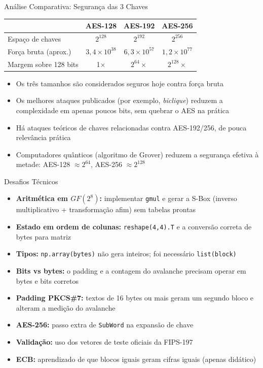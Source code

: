 \documentclass[aspectratio=169,11pt]{beamer}
\begin{document}
\begin{frame}{Análise Comparativa: Segurança das 3 Chaves}
  \small
  \begin{tabular}{lccc}
    \toprule
    & \textbf{AES-128} & \textbf{AES-192} & \textbf{AES-256}\\
    \midrule
    Espaço de chaves & $2^{128}$ & $2^{192}$ & $2^{256}$\\
    Força bruta (aprox.) & $3{,}4\times10^{38}$ & $6{,}3\times10^{57}$ & $1{,}2\times10^{77}$\\
    Margem sobre 128 bits & 1$\times$ & $2^{64}\times$ & $2^{128}\times$\\
    \bottomrule
  \end{tabular}

  \vspace{0.6em}
  \begin{itemize}
    \item Os três tamanhos são considerados seguros hoje contra força bruta
    \item Os melhores ataques publicados (por exemplo, \emph{biclique}) reduzem a
          complexidade em apenas poucos bits, sem quebrar o AES na prática
    \item Há ataques teóricos de chaves relacionadas contra AES-192/256, de pouca relevância prática
    \item Computadores quânticos (algoritmo de Grover) reduzem a segurança efetiva à metade:
          AES-128 $\approx 2^{64}$, AES-256 $\approx 2^{128}$
  \end{itemize}
\end{frame}

\begin{frame}{Desafios Técnicos}
  \small
  \begin{itemize}
    \item \textbf{Aritmética em $GF(2^8)$:} implementar \texttt{gmul} e gerar a S-Box
          (inverso multiplicativo + transformação afim) sem tabelas prontas
    \item \textbf{Estado em ordem de colunas:} \texttt{reshape(4,4).T} e a conversão
          correta de bytes para matriz
    \item \textbf{Tipos:} \texttt{np.array(bytes)} não gera inteiros; foi necessário \texttt{list(block)}
    \item \textbf{Bits vs bytes:} o padding e a contagem do avalanche precisam operar em bytes e bits corretos
    \item \textbf{Padding PKCS\#7:} textos de 16 bytes ou mais geram um segundo bloco e
          alteram a medição do avalanche
    \item \textbf{AES-256:} passo extra de \texttt{SubWord} na expansão de chave
    \item \textbf{Validação:} uso dos vetores de teste oficiais da FIPS-197
    \item \textbf{ECB:} aprendizado de que blocos iguais geram cifras iguais (apenas didático)
  \end{itemize}
\end{frame}
\end{document}
